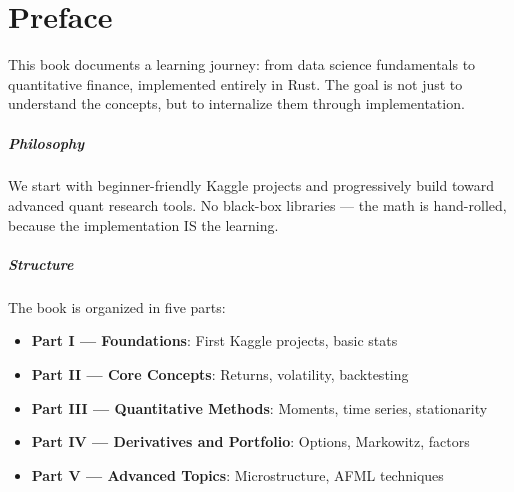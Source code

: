 \documentclass[
	fontsize=10pt,
	twoside=false,
	secnumdepth=2,
	open=any,
]{kaobook/kaobook}
\begin{document}
\dedication{
	The market can stay irrational \\
    longer than you can stay solvent.\\
	\flushright -- John Maynard Keynes
}


\maketitle


\chapter*{Preface}

This book documents a learning journey: from data science fundamentals to
quantitative finance, implemented entirely in Rust. The goal is not just to
understand the concepts, but to internalize them through implementation.

\paragraph{Philosophy}
We start with beginner-friendly Kaggle projects and progressively build toward
advanced quant research tools. No black-box libraries --- the math is
hand-rolled, because the implementation IS the learning.

\paragraph{Structure}
The book is organized in five parts:
\begin{itemize}
    \item \textbf{Part I --- Foundations}: First Kaggle projects, basic stats
    \item \textbf{Part II --- Core Concepts}: Returns, volatility, backtesting
    \item \textbf{Part III --- Quantitative Methods}: Moments, time series, stationarity
    \item \textbf{Part IV --- Derivatives and Portfolio}: Options, Markowitz, factors
    \item \textbf{Part V --- Advanced Topics}: Microstructure, AFML techniques
\end{itemize}
\end{document}
